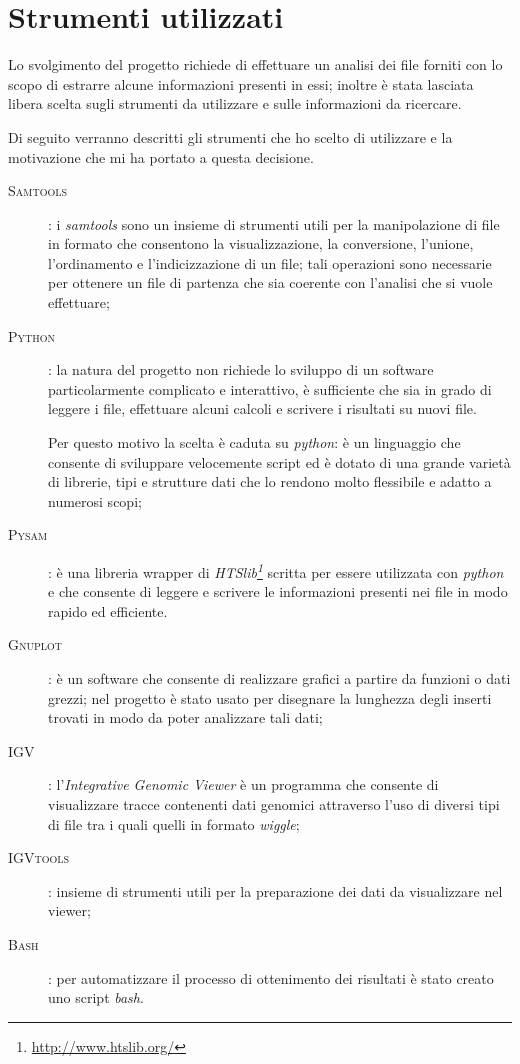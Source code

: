 \section{Strumenti utilizzati}
Lo svolgimento del progetto richiede di effettuare un analisi dei file  forniti con lo scopo di estrarre alcune informazioni presenti in essi; inoltre è stata lasciata libera scelta sugli strumenti da utilizzare e sulle informazioni da ricercare.

Di seguito verranno descritti gli strumenti che ho scelto di utilizzare e la motivazione che mi ha portato a questa decisione.

\begin{description}
\item[\textsc{Samtools}]: i \emph{samtools} sono un insieme di strumenti utili per la manipolazione di file in formato  che consentono la visualizzazione, la conversione, l'unione, l'ordinamento e l'indicizzazione di un file; tali operazioni sono necessarie per ottenere un file di partenza che sia coerente con l'analisi che si vuole effettuare;
\item[\textsc{Python}]: la natura del progetto non richiede lo sviluppo di un software particolarmente complicato e interattivo, è sufficiente che sia in grado di leggere i file, effettuare alcuni calcoli e scrivere i risultati su nuovi file.

Per questo motivo la scelta è caduta su \emph{python}: è un linguaggio che consente di sviluppare velocemente script ed è dotato di una grande varietà di librerie, tipi e strutture dati che lo rendono molto flessibile e adatto a numerosi scopi;
\item[\textsc{Pysam}]: è una libreria wrapper di \emph{HTSlib\footnote{\url{http://www.htslib.org/}}} scritta per essere utilizzata con \emph{python} e che consente di leggere e scrivere le informazioni presenti nei  file in modo rapido ed efficiente.
\item[\textsc{Gnuplot}]: è un software che consente di realizzare grafici a partire da funzioni o dati grezzi; nel progetto è stato usato per disegnare la lunghezza degli inserti trovati in modo da poter analizzare tali dati;
\item[\textsc{IGV}]: l'\emph{Integrative Genomic Viewer} è un programma che consente di visualizzare tracce contenenti dati genomici attraverso l'uso di diversi tipi di file tra i quali quelli in formato \emph{wiggle};
\item[\textsc{IGVtools}]: insieme di strumenti utili per la preparazione dei dati da visualizzare nel viewer;
\item[\textsc{Bash}]: per automatizzare il processo di ottenimento dei risultati è stato creato uno script \emph{bash}.
\end{description}